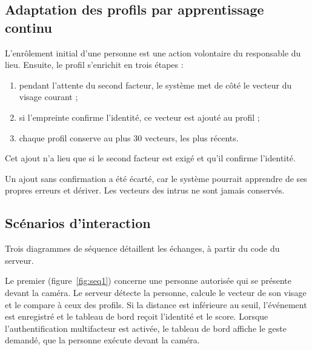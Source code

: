 \subsection{Adaptation des profils par apprentissage continu}\label{sec:adapt}

L'enrôlement initial d'une personne est une action volontaire du responsable du lieu. Ensuite, le profil s'enrichit en trois étapes :
\begin{enumerate}
  \item pendant l'attente du second facteur, le système met de côté le vecteur du visage courant ;
  \item si l'empreinte confirme l'identité, ce vecteur est ajouté au profil ;
  \item chaque profil conserve au plus 30 vecteurs, les plus récents.
\end{enumerate}
Cet ajout n'a lieu que si le second facteur est exigé et qu'il confirme l'identité. \begin{maj}
Un ajout sans confirmation a été écarté, car le système pourrait apprendre de ses propres erreurs et dériver. Les vecteurs des intrus ne sont jamais conservés.
\end{maj}


\subsection{Scénarios d'interaction}

Trois diagrammes de séquence détaillent les échanges, à partir du code du serveur.

Le premier (figure~\ref{fig:seq1}) concerne une personne autorisée qui se présente devant la caméra. Le serveur détecte la personne, calcule le vecteur de son visage et le compare à ceux des profils. Si la distance est inférieure au seuil, l'événement est enregistré et le tableau de bord reçoit l'identité et le score. Lorsque l'authentification multifacteur est activée, le tableau de bord affiche le geste demandé, que la personne exécute devant la caméra.

